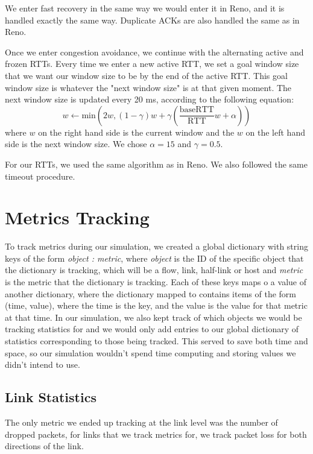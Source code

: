 \documentclass{article}
\begin{document}
We enter fast recovery in the same way we would enter it in Reno, and it is handled exactly the same way. Duplicate ACKs are also handled the same as in Reno.

Once we enter congestion avoidance, we continue with the alternating active and frozen RTTs. Every time we enter a new active RTT, we set a goal window size that we want our window size to be by the end of the active RTT. This goal window size is whatever the "next window size" is at that given moment. The next window size is updated every 20 ms, according to the following equation: $$ w \leftarrow \textrm{min}(2w, (1-\gamma)w + \gamma(\frac{\textrm{baseRTT}}{\textrm{RTT}}w + \alpha)) $$
where $w$ on the right hand side is the current window and the $w$ on the left hand side is the next window size. We chose $\alpha = 15$ and $\gamma = 0.5$. 

For our RTTs, we used the same algorithm as in Reno. We also followed the same timeout procedure.


\section{Metrics Tracking}

To track metrics during our simulation, we created a global dictionary with string keys of the form {\em object : metric}, where {\em object} is the ID of the specific object that the dictionary is tracking, which will be a flow, link, half-link or host and {\em metric} is the metric that the dictionary is tracking. Each of these keys maps o a value of another dictionary, where the dictionary mapped to contains items of the form (time, value), where the time is the key, and the value is the value for that metric at that time. In our simulation, we also kept track of which objects we would be tracking statistics for and we would only add entries to our global dictionary of statistics corresponding to those being tracked. This served to save both time and space, so our simulation wouldn't spend time computing and storing values we didn't intend to use. 

\subsection{Link Statistics}
The only metric we ended up tracking at the link level was the number of dropped packets, for links that we track metrics for, we track packet loss for both directions of the link.
\end{document}
